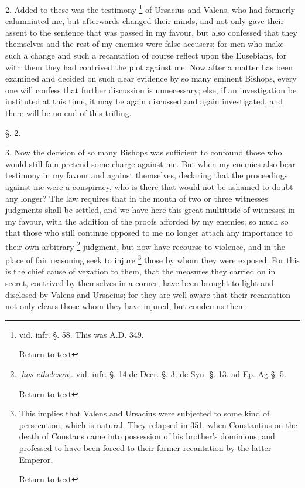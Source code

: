 2. Added to these was the testimony \footnote{vid. infr. §. 58. This was A.D. 349.

Return to text} of Ursacius and Valens, who had formerly calumniated me, but
afterwards changed their minds, and not only gave their assent to the
sentence that was passed in my favour, but also confessed that
they themselves and the rest of my enemies were false accusers; for
men who make such a change and such a recantation of course reflect
upon the Eusebians, for with them they had contrived the plot against
me. Now after a matter has been examined and decided on such clear
evidence by so many eminent Bishops, every one will confess that
further discussion is unnecessary; else, if an investigation be
instituted at this time, it may be again discussed and again
investigated, and there will be no end of this trifling.

§. 2.

3. Now the decision of so many Bishops was
sufficient to confound those who would still fain pretend some charge
against me. But when my enemies also bear testimony in my favour and
against themselves, declaring that the proceedings against me were a
conspiracy, who is there that would not be ashamed to doubt any
longer? The law requires that in the mouth of two or three witnesses
judgments shall be settled, and we have here this great multitude of
witnesses in my favour, with the addition of the proofs afforded by my
enemies; so much so that those who still continue opposed to me no
longer attach any importance to their own arbitrary \footnote{[\emph{h\={o}s \={e}thel\={e}san}]. vid. infr. §. 14.de Decr.
§. 3. de Syn. §. 13. ad Ep. Ag §. 5.

Return to text} judgment, but now have recourse to violence, and in the place
of fair reasoning seek to injure \footnote{This implies that Valens and Ursacius were subjected to some kind of
persecution, which is natural. They relapsed in 351, when Constantius
on the death of Constans came into possession of his brother's
dominions; and professed to have been forced to their former
recantation by the latter Emperor.

Return to text} those by whom they were exposed. For this is the chief cause of
vexation to them, that the measures they carried on in secret,
contrived by themselves in a corner, have been brought to light and
disclosed by Valens and Ursacius; for they are well aware that their
recantation not only clears those whom they have injured, but condemns
them.

